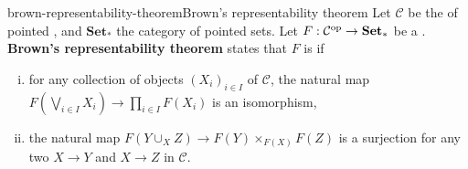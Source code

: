 \begin{topic}{brown-representability-theorem}{Brown's representability theorem}
    Let $\mathcal{C}$ be the  of  pointed , and $\textbf{Set}_*$ the category of pointed sets. Let $F : \mathcal{C}^\textup{op} \to \textbf{Set}_*$ be a . \textbf{Brown's representability theorem} states that $F$ is  if
    \begin{enumerate}[(i)]
        \item for any collection of objects $(X_i)_{i \in I}$ of $\mathcal{C}$, the natural map $F(\bigvee_{i \in I} X_i) \to \prod_{i \in I} F(X_i)$ is an isomorphism,
        \item the natural map $F(Y \cup_X Z) \to F(Y) \times_{F(X)} F(Z)$ is a surjection for any two  $X \to Y$ and $X \to Z$ in $\mathcal{C}$.
    \end{enumerate}
\end{topic}
